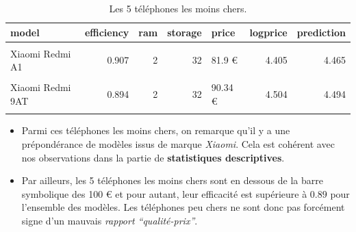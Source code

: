 \documentclass[
  12pt,
]{report}
\begin{document}
\begin{table}[!h]

\caption{\label{tab:kbl_expensive}Les 5 téléphones les moins chers.}
\centering
\begin{tabular}[t]{lrrrlrr}
\toprule
\textbf{model} & \textbf{efficiency} & \textbf{ram} & \textbf{storage} & \textbf{price} & \textbf{logprice} & \textbf{prediction}\\
\midrule
\cellcolor{gray!6}{Motorola E13} & \cellcolor{gray!6}{0.906} & \cellcolor{gray!6}{2} & \cellcolor{gray!6}{64} & \cellcolor{gray!6}{79 €} & \cellcolor{gray!6}{4.369} & \cellcolor{gray!6}{4.424}\\
Xiaomi Redmi A1 & 0.907 & 2 & 32 & 81.9 € & 4.405 & 4.465\\
\cellcolor{gray!6}{Xiaomi Redmi 9A} & \cellcolor{gray!6}{0.901} & \cellcolor{gray!6}{2} & \cellcolor{gray!6}{32} & \cellcolor{gray!6}{84.6 €} & \cellcolor{gray!6}{4.438} & \cellcolor{gray!6}{4.467}\\
Xiaomi Redmi 9AT & 0.894 & 2 & 32 & 90.34 € & 4.504 & 4.494\\
\cellcolor{gray!6}{Xiaomi Redmi A1+} & \cellcolor{gray!6}{0.901} & \cellcolor{gray!6}{2} & \cellcolor{gray!6}{32} & \cellcolor{gray!6}{98.93 €} & \cellcolor{gray!6}{4.594} & \cellcolor{gray!6}{4.621}\\
\bottomrule
\end{tabular}
\end{table}

\begin{itemize}
\item
  Parmi ces téléphones les moins chers, on remarque qu'il y a une
  prépondérance de modèles issus de marque \emph{Xiaomi}. Cela est
  cohérent avec nos observations dans la partie de \textbf{statistiques
  descriptives}.
\item
  Par ailleurs, les 5 téléphones les moins chers sont en dessous de la
  barre symbolique des 100 € et pour autant, leur efficacité est
  supérieure à \(0.89\) pour l'ensemble des modèles. Les téléphones peu
  chers ne sont donc pas forcément signe d'un mauvais \emph{rapport
  ``qualité-prix''}.
\end{itemize}
\end{document}
